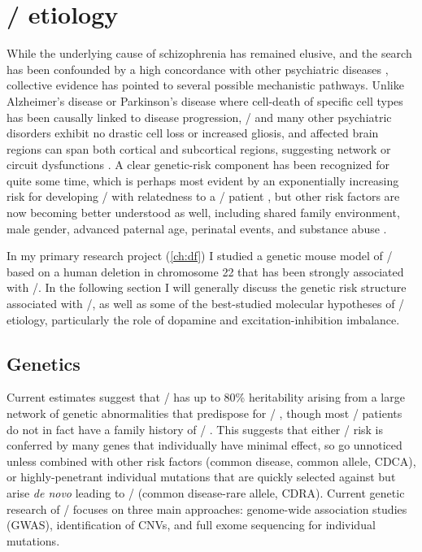 \section{\Scz/ etiology}
\label{sec:intro:scz:etiology}
While the underlying cause of schizophrenia has remained elusive, and the search has been confounded by a high concordance with other psychiatric diseases \citep{Kessler2005}, collective evidence has pointed to several possible mechanistic pathways.
Unlike Alzheimer's disease or Parkinson's disease where cell-death of specific cell types has been causally linked to disease progression, \scz/ and many other psychiatric disorders exhibit no drastic cell loss or increased gliosis, and affected brain regions can span both cortical and subcortical regions, suggesting network or circuit dysfunctions \citep{Uhlhaas2012, Lewis2002}.
A clear genetic-risk component has been recognized for quite some time, which is perhaps most evident by an exponentially increasing risk for developing \scz/ with relatedness to a \scz/ patient \citep{Rodriguez-Murillo2012}, but other risk factors are now becoming better understood as well, including shared family environment, male gender, advanced paternal age, perinatal events, and substance abuse \citep{Lichtenstein2009}.

In my primary research project (\autoref{ch:df}) I studied a genetic mouse model of \scz/ based on a human deletion in chromosome 22 that has been strongly associated with \scz/. In the following section I will generally discuss the genetic risk structure associated with \scz/, as well as some of the best-studied molecular hypotheses of \scz/ etiology, particularly the role of dopamine and excitation-inhibition imbalance.

\subsection{Genetics}
Current estimates suggest that \scz/ has up to 80\% heritability arising from a large network of genetic abnormalities that predispose for \scz/ \citep{Ripke2011, Tandon2008}, though most \scz/ patients do not in fact have a family history of \scz/ \citep{Tandon2008, Rodriguez-Murillo2012}.
This suggests that either \scz/ risk is conferred by many genes that individually have minimal effect, so go unnoticed unless combined with other risk factors (common disease, common allele, CDCA), or highly-penetrant individual mutations that are quickly selected against but arise \emph{de novo} leading to \scz/ (common disease-rare allele, CDRA).
Current genetic research of \scz/ focuses on three main approaches: genome-wide association studies (GWAS), identification of \ac{CNVs}, and full exome sequencing for individual mutations.


